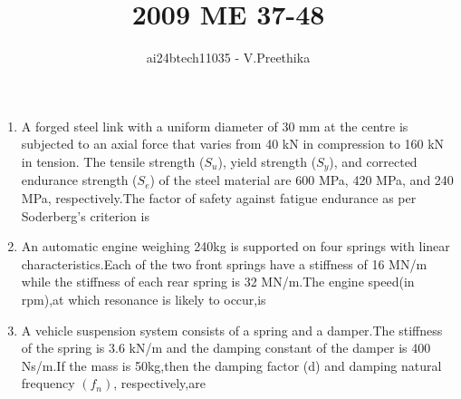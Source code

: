 \documentclass[journal]{IEEEtran}
\begin{document}

\vspace{3cm}

\title{2009 ME 37-48}
\author{ai24btech11035 - V.Preethika}
\maketitle
\bigskip

\renewcommand{\thefigure}{\theenumi}
\renewcommand{\thetable}{\theenumi}
\begin{enumerate}[start=37]
\item A forged steel link with a uniform diameter of 30 mm at the centre is subjected to an axial force that varies from 40 kN in compression to 160 kN in tension. The tensile strength ($S_u$), yield strength ($S_y$), and corrected endurance strength ($S_e$) of the steel material are 600 MPa, 420 MPa, and 240 MPa, respectively.The factor of safety against fatigue endurance as per Soderberg's criterion is
\begin{enumerate}
\end{enumerate}
\item An automatic engine weighing 240kg is supported on four springs with linear characteristics.Each of the two front springs have a stiffness of 16 MN/m while the stiffness of each rear spring is 32 MN/m.The engine speed(in rpm),at which resonance is likely to occur,is
\begin{enumerate}
\end{enumerate}
\item A vehicle suspension system consists of a spring and a damper.The stiffness of the spring is 3.6 kN/m and the damping constant of the damper is 400 Ns/m.If the mass is 50kg,then the damping factor (d) and damping natural frequency $(f_n)$, respectively,are
\begin{enumerate}
\begin{multicols}{2}

\end{multicols}
\end{enumerate}
\end{enumerate}
\end{document}
